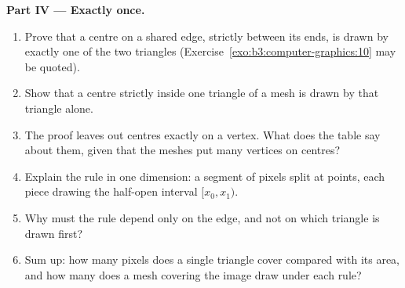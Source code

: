 \begin{problem}
\medskip\noindent\textbf{Part IV --- Exactly once.}
\begin{enumerate}[resume]
  \item Prove that a centre on a shared edge, strictly between its ends, is drawn by exactly one of the two triangles (Exercise~\ref{exo:b3:computer-graphics:10} may be quoted).
  \item Show that a centre strictly inside one triangle of a mesh is drawn by that triangle alone.
  \item The proof leaves out centres exactly on a vertex. What does the table say about them, given that the meshes put many vertices on centres?
  \item Explain the rule in one dimension: a segment of pixels split at points, each piece drawing the half-open interval $[x_0, x_1)$.
  \item Why must the rule depend only on the edge, and not on which triangle is drawn first?
  \item Sum up: how many pixels does a single triangle cover compared with its area, and how many does a mesh covering the image draw under each rule?
\end{enumerate}
\end{problem}
